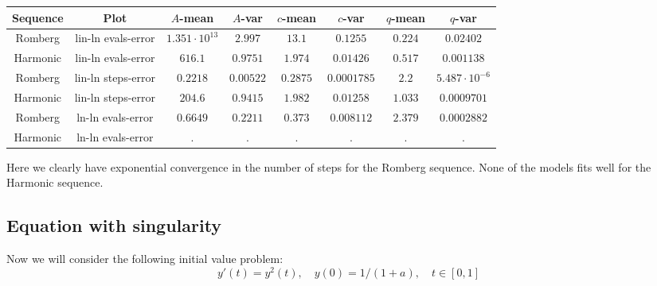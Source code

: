 \begin{table}[H]
    \centering
    \small
     \begin{tabular}{c|c||c|c|c|c|c|c}
Sequence & Plot & \(A\)-mean & \(A\)-var & \(c\)-mean & \(c\)-var & \(q\)-mean & \(q\)-var\\\hline
Romberg & lin-ln evals-error & \(1.351\cdot 10^{13}\) & \(2.997\) & \(13.1\) & \(0.1255\) & \(0.224\) & \(0.02402\) \\
Harmonic & lin-ln evals-error & \(616.1\) & \(0.9751\) & \(1.974\) & \(0.01426\) & \(0.517\) & \(0.001138\) \\
Romberg & lin-ln steps-error & \(0.2218\) & \(0.00522\) & \(0.2875\) & \(0.0001785\) & \(2.2\) & \(5.487\cdot 10^{-6}\) \\
Harmonic & lin-ln steps-error & \(204.6\) & \(0.9415\) & \(1.982\) & \(0.01258\) & \(1.033\) & \(0.0009701\) \\
Romberg & ln-ln evals-error & \(0.6649\) & \(0.2211\) & \(0.373\) & \(0.008112\) & \(2.379\) & \(0.0002882\) \\
Harmonic & ln-ln evals-error & . & . & . & . & . & . \\
    \end{tabular}
    \label{tab:my_label}
\end{table}

Here we clearly have exponential convergence in the number of steps for the Romberg sequence. None of the models fits well for the Harmonic sequence.

\subsection{Equation with singularity}

Now we will consider the following initial value problem:
\begin{equation}\label{46}
y'(t) = y^2(t),\quad y(0) = 1/(1+a), \quad t\in [0,1]
\end{equation}

